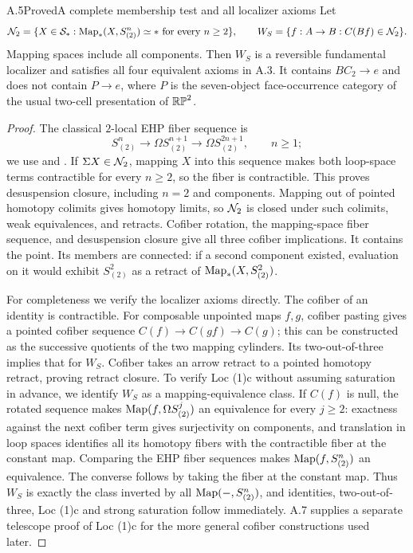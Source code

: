\begin{claim}{A.5}{Proved}{A complete membership test and all localizer axioms}\label{A5}
Let
\[
 \mathcal N_2=\{X\in\mathcal S_*:\operatorname{Map}_*(X,S^n_{(2)})\simeq *\text{ for every }n\geq2\},
 \qquad W_S=\{f:A\to B:C(Bf)\in\mathcal N_2\}.
\]
Mapping spaces include all components. Then $W_S$ is a reversible fundamental localizer and satisfies all four equivalent axioms in A.3. It contains $B C_2\to e$ and does not contain $P\to e$, where $P$ is the seven-object face-occurrence category of the usual two-cell presentation of $\mathbb{RP}^2$.
\end{claim}
\begin{proof}
The classical $2$-local EHP fiber sequence is
\[
 S^n_{(2)}\longrightarrow\Omega S^{n+1}_{(2)}
              \longrightarrow\Omega S^{2n+1}_{(2)},\qquad n\geq1;
\]
we use \cite[Theorem 2.2, with its preceding localization convention]{ABoyde} and \cite[slide 2 and Theorem 1(i),(ii)]{ARavenelEHP}. If $\Sigma X\in\mathcal N_2$, mapping $X$ into this sequence makes both loop-space terms contractible for every $n\geq2$, so the fiber is contractible. This proves desuspension closure, including $n=2$ and components. Mapping out of pointed homotopy colimits gives homotopy limits, so $\mathcal N_2$ is closed under such colimits, weak equivalences, and retracts. Cofiber rotation, the mapping-space fiber sequence, and desuspension closure give all three cofiber implications. It contains the point. Its members are connected: if a second component existed, evaluation on it would exhibit $S^2_{(2)}$ as a retract of $\operatorname{Map}_*(X,S^2_{(2)})$.

For completeness we verify the localizer axioms directly. The cofiber of an identity is contractible. For composable unpointed maps $f,g$, cofiber pasting gives a pointed cofiber sequence $C(f)\to C(gf)\to C(g)$; this can be constructed as the successive quotients of the two mapping cylinders. Its two-out-of-three implies that for $W_S$. Cofiber takes an arrow retract to a pointed homotopy retract, proving retract closure. To verify Loc (1)c without assuming saturation in advance, we identify $W_S$ as a mapping-equivalence class. If $C(f)$ is null, the rotated sequence makes $\operatorname{Map}(f,\Omega S^j_{(2)})$ an equivalence for every $j\geq2$: exactness against the next cofiber term gives surjectivity on components, and translation in loop spaces identifies all its homotopy fibers with the contractible fiber at the constant map. Comparing the EHP fiber sequences makes $\operatorname{Map}(f,S^n_{(2)})$ an equivalence. The converse follows by taking the fiber at the constant map. Thus $W_S$ is exactly the class inverted by all $\operatorname{Map}(-,S^n_{(2)})$, and identities, two-out-of-three, Loc (1)c and strong saturation follow immediately. A.7 supplies a separate telescope proof of Loc (1)c for the more general cofiber constructions used later.


\end{proof}
